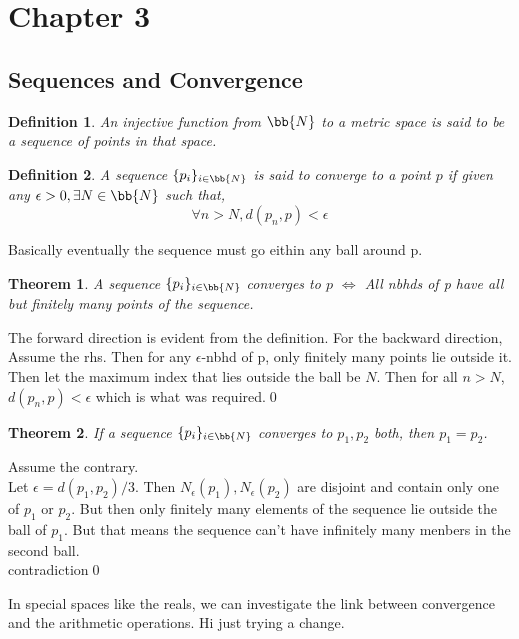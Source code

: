 \documentclass{myclass}
\newtheorem*{definition}{Definition}
\newtheorem*{theorem}{Theorem}
\begin{document}
\section*{Chapter 3}

\subsection{Sequences and Convergence}

\begin{definition}
    An injective function from $\bb{N}$ to a metric space is said to be a 
    sequence of points in that space.
\end{definition}

\begin{definition}
    A sequence $\{p_i\}_{i\in\bb{N}}$ is said to converge to a point $p$ if given any
    $\epsilon>0,\exists N\in\bb{N}$ such that,$$\forall n>N, d(p_n,p)<\epsilon$$
\end{definition}

\begin{remark}
    Basically eventually the sequence must go eithin any ball around p.
\end{remark}

\begin{theorem}
    A sequence $\{p_i\}_{i\in\bb{N}}$ converges to $p$ $\iff$ All nbhds of p have all but finitely many points of the sequence.
\end{theorem}
\begin{prf}
    The forward direction is evident from the definition. For the backward direction, Assume the rhs.
    Then for any $\epsilon$-nbhd of p, only finitely many points lie outside it. Then let the maximum index that lies outside the ball be $N$.
    Then for all $n>N$,$d(p_n,p)<\epsilon$ which is what was required.\qed
\end{prf}

\begin{theorem}
    If a sequence $\{p_i\}_{i\in\bb{N}}$ converges to $p_1,p_2$ both, then $p_1=p_2$.
\end{theorem}
\begin{prf}
    Assume the contrary.\\
    Let $\epsilon=d(p_1,p_2)/3$. Then $N_\epsilon(p_1),N_\epsilon(p_2)$ are disjoint and contain only one of $p_1$ or $p_2$.
    But then only finitely many elements of the sequence lie outside the ball of $p_1$. But that means the sequence can't have infinitely many menbers in the second ball.\\
    contradiction\qed
\end{prf}

In special spaces like the reals, we can investigate the link between convergence and the arithmetic operations.
Hi just trying a change.
\end{document}
